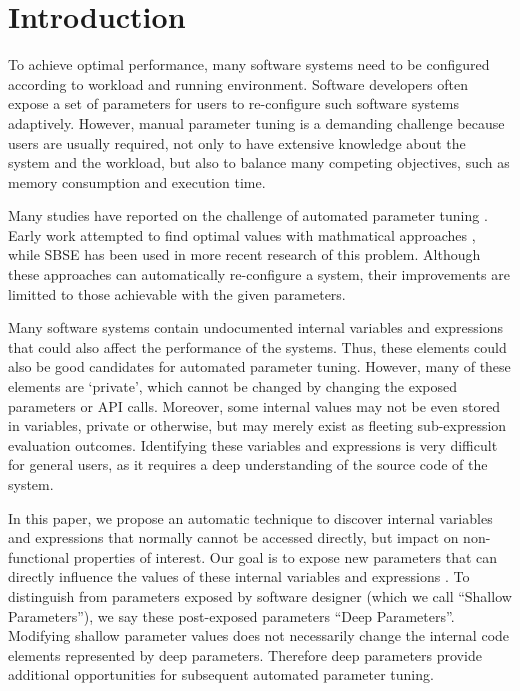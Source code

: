
\section{Introduction}

To achieve optimal performance, many software systems need to be configured according to workload and running environment. 
Software developers often expose a set of parameters for users to re-configure such software systems adaptively.
However, manual parameter tuning is a demanding challenge because users are usually required, not only to have extensive knowledge about the system and the workload, but also to balance many competing objectives, such as memory consumption and execution time.

Many studies have reported on the challenge of automated parameter tuning \cite{Hoffmann:2011:DKR:1961296.1950390, Vuduc01statisticalmodels,autotuning,Whaley:1998:ATL:509058.509096,Tapus:2002:AHT:762761.762771, hutter2009paramils,arcuri-ssbse-2011}. Early work attempted to find optimal values with mathmatical approaches \cite{Vuduc01statisticalmodels,autotuning,Whaley:1998:ATL:509058.509096,Tapus:2002:AHT:762761.762771}, while SBSE \cite{Harman:2007:CSF:1253532.1254729} has been used in more recent research \cite{hutter2009paramils,arcuri-ssbse-2011,Hoffmann:2011:DKR:1961296.1950390} of this problem. Although these approaches can automatically re-configure a system, their improvements are limitted to those achievable with the given parameters.


Many software systems contain undocumented internal variables and expressions that could also affect the performance of the systems. Thus, these elements could also be good candidates for automated parameter tuning. However, many of these elements are `private', which cannot be changed by changing the exposed parameters or API calls. Moreover, some internal values may not be even stored in variables, private or otherwise, but may merely exist as fleeting sub-expression evaluation outcomes. Identifying these variables and expressions is very difficult for general users, as it requires a deep understanding of the source code of the system. 


In this paper, we propose an automatic technique to discover internal variables and expressions that normally cannot be accessed directly, but impact on non-functional properties of interest. Our goal is to expose new parameters that can directly influence the values of these internal variables and expressions \cite{harman2014genetic}. To distinguish from parameters exposed by software designer (which we call ``Shallow Parameters''), we say these post-exposed parameters ``Deep Parameters''. Modifying shallow parameter values does not necessarily change the internal code elements represented by deep parameters. Therefore deep parameters provide additional opportunities for subsequent automated parameter tuning.


